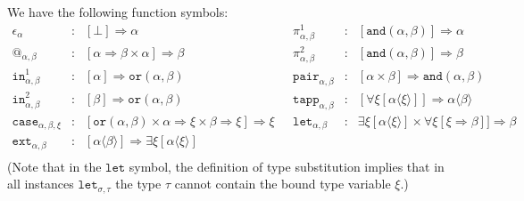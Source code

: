 \documentclass[runningheads,a4paper]{llncs}
\newcommand{\quant}[2]{\forall #1[#2]}
\newcommand{\qquant}[3]{#1 #2[#3]}
\newcommand{\arrtype}{\Rightarrow}
\newcommand{\meta}[2]{#1\langle#2\rangle}
\begin{document}
We have the following function symbols:
\[
\begin{array}{rclrcl}
\epsilon_\alpha & : & [\bot] \arrtype \alpha &
\pi^1_{\alpha,\beta} & : & [\mathtt{and}(\alpha,\beta)] \arrtype \alpha \\
@_{\alpha,\beta} & : & [\alpha \arrtype \beta \times \alpha] \arrtype \beta &
\pi^2_{\alpha,\beta} & : & [\mathtt{and}(\alpha,\beta)] \arrtype \beta \\
\mathtt{in}^1_{\alpha,\beta} & : & [\alpha] \arrtype
  \mathtt{or}(\alpha,\beta) &
\mathtt{pair}_{\alpha,\beta} & : & [\alpha \times \beta] \arrtype
  \mathtt{and}(\alpha,\beta) \\
\mathtt{in}^2_{\alpha,\beta} & : & [\beta] \arrtype
  \mathtt{or}(\alpha,\beta) &
\mathtt{tapp}_{\alpha,\beta} & : &
  [\quant{\xi}{\meta{\alpha}{\xi}}] \arrtype \meta{\alpha}{\beta} \\
\mathtt{case}_{\alpha,\beta,\xi} & : & [\mathtt{or}(\alpha,\beta) \times
  \alpha \arrtype \xi \times \beta \arrtype \xi] \arrtype \xi\ \ \ & 
\mathtt{let}_{\alpha,\beta} & : &
  \qquant{\exists}{\xi}{\meta{\alpha}{\xi}} \times 
  \quant{\xi}{\xi \arrtype \beta}] \arrtype \beta \\
\mathtt{ext}_{\alpha,\beta} & : & [\meta{\alpha}{\beta}] \arrtype
  \qquant{\exists}{\xi}{\meta{\alpha}{\xi}} \\
\end{array}
\]
(Note that in the $\mathtt{let}$ symbol, the definition of type
substitution implies that in all instances $\mathtt{let}_{\sigma,\tau}$
the type $\tau$ cannot contain the bound type variable $\xi$.)
\end{document}
